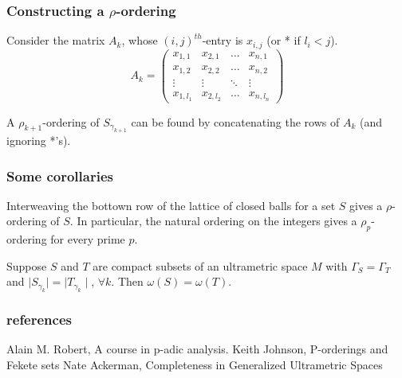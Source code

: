 \documentclass{beamer}
\theoremstyle{definition}
\begin{document}
\begin{frame}
\frametitle{Constructing a $\rho$-ordering}
Consider the matrix $A_k$, whose $(i,j)^{th}$-entry is $x_{i,j}$ (or * if $l_i < j$).
\[A_k=
 \begin{pmatrix}
  x_{1,1} & x_{2,1} & \ldots  &x_{n,1} \\
  x_{1,2} & x_{2,2} &\ldots &x_{n,2} \\
  \vdots & \vdots & \ddots & \vdots \\
  x_{1,l_1} & x_{2,l_2} & \ldots &x_{n,l_n}
 \end{pmatrix}
\]

 A $\rho_{k+1}$-ordering of $S_{\gamma_{k+1}}$ can be found by concatenating the rows of $A_k$ (and ignoring *'s).
\end{frame}

\begin{frame}
\frametitle{Some corollaries}
\begin{corollary}
Interweaving the bottown row of the lattice of closed balls for a set $S$ gives a $\rho$-ordering of $S$. In particular, the natural ordering on the integers gives a $\rho_p$-ordering for every prime $p$. 

\end{corollary}

\begin{corollary}
Suppose $S$ and $T$ are compact subsets of an ultrametric space $M$ with $\Gamma_S = \Gamma_T$ and $\mid S_{\gamma_k}\mid =\mid T_{\gamma_k}\mid$, $\forall k$. Then $\omega(S) = \omega(T)$. 
\end{corollary}
\end{frame}



\begin{frame}
\frametitle{references}
\begin{thebibliography}{1}
 Alain M. Robert, A course in p-adic analysis.
 Keith Johnson, P-orderings and Fekete sets
 Nate Ackerman,  Completeness in Generalized Ultrametric Spaces
\end{thebibliography}
\end{frame}
\end{document}
